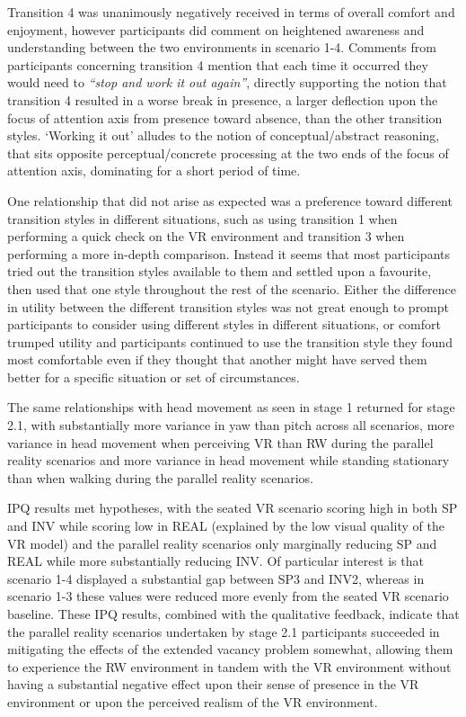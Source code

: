 Transition 4 was unanimously negatively received in terms of overall comfort and enjoyment, however participants did comment on heightened awareness and understanding between the two environments in scenario 1-4. Comments from participants concerning transition 4 mention that each time it occurred they would need to \textit{``stop and work it out again''}, directly supporting the notion that transition 4 resulted in a worse break in presence, a larger deflection upon the focus of attention axis from presence toward absence, than the other transition styles. `Working it out' alludes to the notion of conceptual/abstract reasoning, that sits opposite perceptual/concrete processing at the two ends of the focus of attention axis, dominating for a short period of time.

One relationship that did not arise as expected was a preference toward different transition styles in different situations, such as using transition 1 when performing a quick check on the VR environment and transition 3 when performing a more in-depth comparison. Instead it seems that most participants tried out the transition styles available to them and settled upon a favourite, then used that one style throughout the rest of the scenario. Either the difference in utility between the different transition styles was not great enough to prompt participants to consider using different styles in different situations, or comfort trumped utility and participants continued to use the transition style they found most comfortable even if they thought that another might have served them better for a specific situation or set of circumstances.

The same relationships with head movement as seen in stage 1 returned for stage 2.1, with substantially more variance in yaw than pitch across all scenarios, more variance in head movement when perceiving VR than RW during the parallel reality scenarios and more variance in head movement while standing stationary than when walking during the parallel reality scenarios.

IPQ results met hypotheses, with the seated VR scenario scoring high in both SP and INV while scoring low in REAL (explained by the low visual quality of the VR model) and the parallel reality scenarios only marginally reducing SP and REAL while more substantially reducing INV. Of particular interest is that scenario 1-4 displayed a substantial gap between SP3 and INV2, whereas in scenario 1-3 these values were reduced more evenly from the seated VR scenario baseline. These IPQ results, combined with the qualitative feedback, indicate that the parallel reality scenarios undertaken by stage 2.1 participants succeeded in mitigating the effects of the extended vacancy problem somewhat, allowing them to experience the RW environment in tandem with the VR environment without having a substantial negative effect upon their sense of presence in the VR environment or upon the perceived realism of the VR environment.

